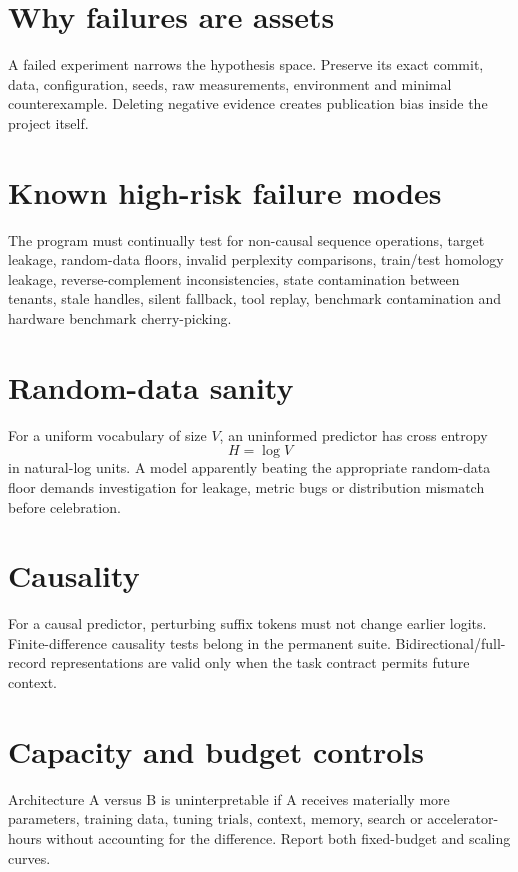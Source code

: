 \section{Why failures are assets}
A failed experiment narrows the hypothesis space. Preserve its exact commit, data, configuration, seeds, raw measurements, environment and minimal counterexample. Deleting negative evidence creates publication bias inside the project itself.

\section{Known high-risk failure modes}
The program must continually test for non-causal sequence operations, target leakage, random-data floors, invalid perplexity comparisons, train/test homology leakage, reverse-complement inconsistencies, state contamination between tenants, stale handles, silent fallback, tool replay, benchmark contamination and hardware benchmark cherry-picking.

\section{Random-data sanity}
For a uniform vocabulary of size $V$, an uninformed predictor has cross entropy
\[
H=\log V
\]
in natural-log units. A model apparently beating the appropriate random-data floor demands investigation for leakage, metric bugs or distribution mismatch before celebration.

\section{Causality}
For a causal predictor, perturbing suffix tokens must not change earlier logits. Finite-difference causality tests belong in the permanent suite. Bidirectional/full-record representations are valid only when the task contract permits future context.

\section{Capacity and budget controls}
Architecture A versus B is uninterpretable if A receives materially more parameters, training data, tuning trials, context, memory, search or accelerator-hours without accounting for the difference. Report both fixed-budget and scaling curves.


